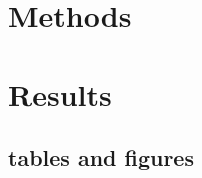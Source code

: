 \documentclass[a4paper, hidelinks]{article} %
\begin{document}
	\nolinenumbers
\section{Methods}
	\linenumbers
%	
%	
	\nolinenumbers
\section{Results}
	\linenumbers
	\subsection{tables and figures}
	
\end{document}
